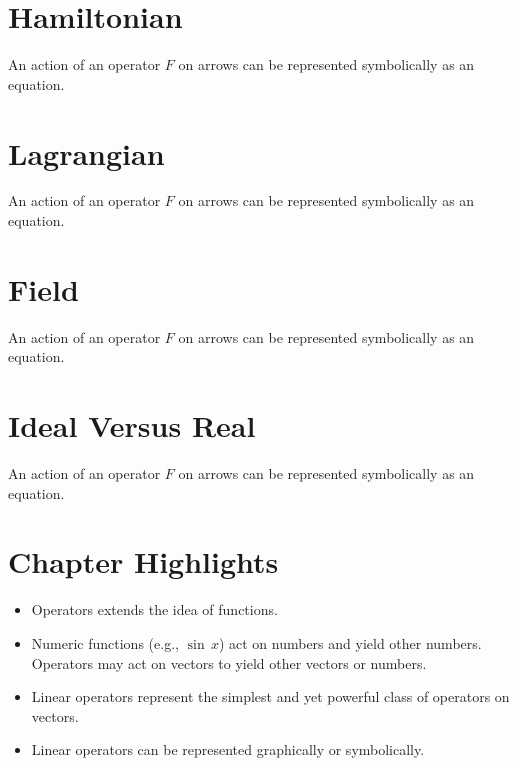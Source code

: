 \section{Hamiltonian}\label{sec:Hamiltonian}
An action of an operator $F$ on arrows can be represented symbolically
as an equation.

\section{Lagrangian}\label{sec:Lagrangian}
An action of an operator $F$ on arrows can be represented symbolically
as an equation.

\section{Field}\label{sec:Field}
An action of an operator $F$ on arrows can be represented symbolically
as an equation.

\section{Ideal Versus Real}\label{sec:IdealVsReal}
An action of an operator $F$ on arrows can be represented symbolically
as an equation.



\section*{Chapter Highlights}
{\chhc
  \it  
\begin{itemize}
\item Operators extends the idea of functions.
\item Numeric functions (e.g., $\sin\,x$) act on numbers and yield
  other numbers. Operators may act on vectors to yield other vectors
  or numbers.
\item Linear operators represent the simplest and yet powerful class
  of operators on vectors.
\item Linear operators can be represented graphically or symbolically.
\end{itemize}

}
